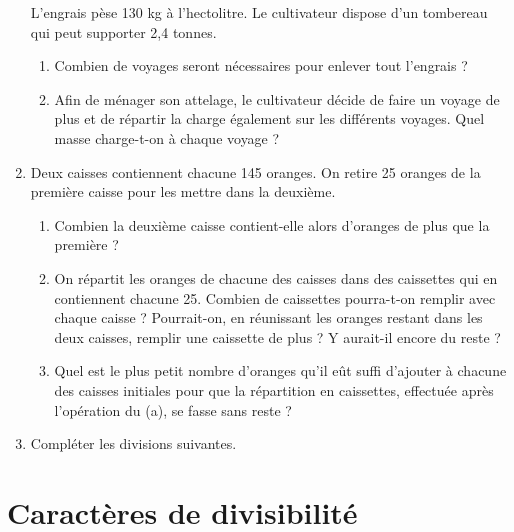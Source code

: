 \documentclass[12 pt]{report}
\theoremstyle{plain}
\newcounter{n}
\begin{document}
\begin{enumerate}
 L'engrais pèse 130 kg à l'hectolitre. Le cultivateur dispose d'un tombereau qui peut supporter 2,4 tonnes. 
 \begin{enumerate}
 \item Combien de voyages seront nécessaires pour enlever
 tout l'engrais ?
 \item  Afin de ménager son attelage, le cultivateur décide de faire un voyage de plus et de répartir la charge également sur les différents voyages. Quel masse charge-t-on à chaque voyage ? 
 \end{enumerate}
 \item Deux caisses contiennent chacune 145 oranges. On retire 25 oranges de la première caisse pour les mettre dans la deuxième. 
 \begin{enumerate}
 \item Combien la deuxième caisse contient-elle alors d'oranges de plus que la première ? 
 \item On répartit les oranges de chacune des caisses 
 dans des caissettes qui en contiennent chacune 25. 
 Combien de caissettes pourra-t-on remplir avec chaque
 caisse ? Pourrait-on, en réunissant les oranges restant dans les deux caisses, remplir une caissette
 de plus ? Y aurait-il encore du reste ? 
 \item Quel est le plus petit nombre d'oranges qu'il eût suffi d'ajouter à chacune des caisses initiales pour que la répartition en caissettes, effectuée après l'opération du (a), se fasse sans reste ? 
 \end{enumerate}
 \item Compléter les divisions suivantes. 
 
 \end{enumerate}
 
 \chapter{Caractères de divisibilité}
 
\end{document}
